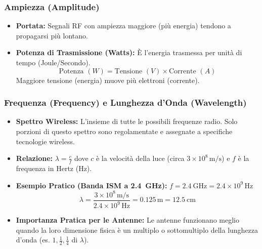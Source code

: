 \subsubsection{Ampiezza (Amplitude)}
\begin{itemize}
    \item \textbf{Portata:} Segnali RF con ampiezza maggiore (più energia) tendono a propagarsi più lontano.
    \item \textbf{Potenza di Trasmissione (Watts):} È l'energia trasmessa per unità di tempo (Joule/Secondo).
    \[ \text{Potenza } (W) = \text{Tensione } (V) \times \text{Corrente } (A) \]
    Maggiore tensione (energia) muove più elettroni (corrente).
\end{itemize}

\subsubsection{Frequenza (Frequency) e Lunghezza d'Onda (Wavelength)}
\begin{itemize}
    \item \textbf{Spettro Wireless:} L'insieme di tutte le possibili frequenze radio. Solo porzioni di questo spettro sono regolamentate e assegnate a specifiche tecnologie wireless.
    \item \textbf{Relazione:} $\lambda = \frac{c}{f}$
    dove $c$ è la velocità della luce (circa $3 \times 10^8 \, \text{m/s}$) e $f$ è la frequenza in Hertz (Hz).
    \item \textbf{Esempio Pratico (Banda ISM a \SI{2.4}{\giga\hertz}):}
    $f = \SI{2.4}{\giga\hertz} = 2.4 \times 10^9 \, \text{Hz}$
    \[ \lambda = \frac{3 \times 10^8 \, \text{m/s}}{2.4 \times 10^9 \, \text{Hz}} = 0.125 \, \text{m} = \SI{12.5}{\centi\meter} \]
    \item \textbf{Importanza Pratica per le Antenne:} Le antenne funzionano meglio quando la loro dimensione fisica è un multiplo o sottomultiplo della lunghezza d'onda (es. $1, \frac{1}{2}, \frac{1}{4}$ di $\lambda$).
\end{itemize}
\begin{center}
\end{center}

